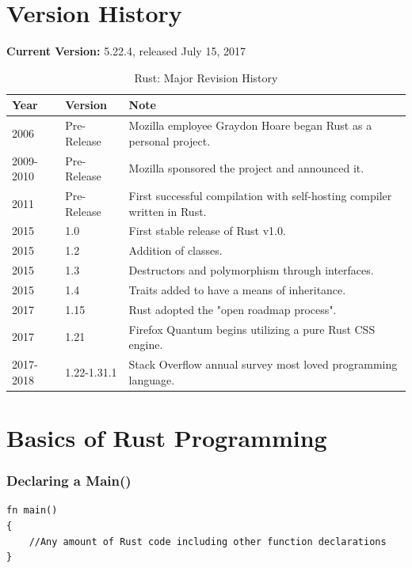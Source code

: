 \documentclass{article}
\begin{document}
\noindent

\section*{Version History}
\textbf{Current Version:} 5.22.4, released July 15, 2017


\begin{table}[b]
\label{revhistory}
\caption*{Rust: Major Revision History\cite{wiki:rust}}
\centering
\begin{tabular}{lll}
\textbf{Year} & \textbf{Version} & \textbf{Note} \\
\hline
2006 & Pre-Release & Mozilla employee Graydon Hoare began Rust as a personal project. \\
2009-2010 & Pre-Release & Mozilla sponsored the project and announced it. \\
2011 & Pre-Release & First successful compilation with self-hosting compiler written in Rust. \\
2015 & 1.0 & First stable release of Rust v1.0. \\
2015 & 1.2 & Addition of classes. \\
2015 & 1.3 & Destructors and polymorphism through interfaces. \\
2015 & 1.4 & Traits added to have a means of inheritance. \\
2017 & 1.15 & Rust adopted the "open roadmap process". \\
2017 & 1.21 & Firefox Quantum begins utilizing a pure Rust CSS engine. \\
2017-2018 & 1.22-1.31.1 & Stack Overflow annual survey most loved programming language. \\
\end{tabular}
\end{table}



\newpage  %
\section*{Basics of Rust Programming\cite{code:rust}}
\subsubsection*{Declaring a Main()}
\begin{verbatim}
fn main()
{
    //Any amount of Rust code including other function declarations
}
\end{verbatim}
\end{document}
